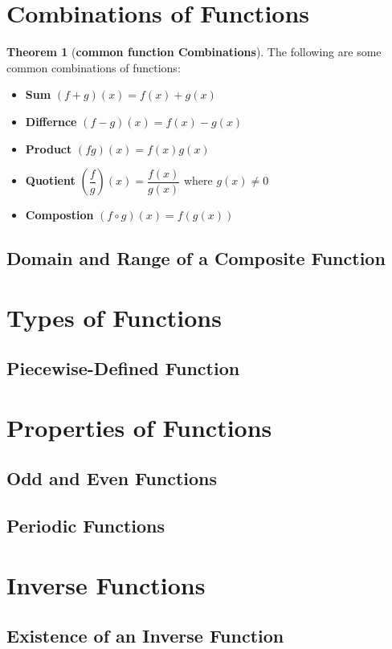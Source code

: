 \documentclass[a4paper]{article}
\theoremstyle{definition}
\newtheorem{theorem}{Theorem}
\begin{document}
\section{Combinations of Functions}
\begin{theorem}[\textbf{common function Combinations}]
    The following are some common combinations of functions:
    \begin{itemize}
        \item \textbf{Sum} \((f+g)(x) = f(x) + g(x)\)
        \item \textbf{Differnce} \((f-g)(x) = f(x) - g(x)\)
        \item \textbf{Product} \((fg)(x) = f(x)g(x)\)
        \item \textbf{Quotient} \((\dfrac{f}{g} )(x) = \dfrac{f(x)}{g(x)} \)
              where \(g(x) \ne 0\)
        \item \textbf{Compostion} \((f\circ g)(x) = f(g(x))\)
    \end{itemize}

\end{theorem}


\subsection{Domain and Range of a Composite Function}
\section{Types of Functions}
\subsection{Piecewise-Defined Function}
\section{Properties of Functions}
\subsection{Odd and Even Functions}
\subsection{Periodic Functions}
\section{Inverse Functions}
\subsection{Existence of an Inverse Function}
\end{document}
